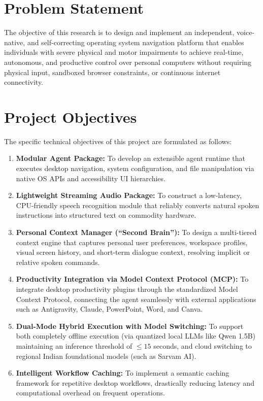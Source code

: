\documentclass[12pt,a4paper]{report}
\begin{document}
\section{Problem Statement}
The objective of this research is to design and implement an independent, voice-native, and self-correcting operating system navigation platform that enables individuals with severe physical and motor impairments to achieve real-time, autonomous, and productive control over personal computers without requiring physical input, sandboxed browser constraints, or continuous internet connectivity.

\section{Project Objectives}
The specific technical objectives of this project are formulated as follows:
\begin{enumerate}[1.]
    \item \textbf{Modular Agent Package:} To develop an extensible agent runtime that executes desktop navigation, system configuration, and file manipulation via native OS APIs and accessibility UI hierarchies.
    \item \textbf{Lightweight Streaming Audio Package:} To construct a low-latency, CPU-friendly speech recognition module that reliably converts natural spoken instructions into structured text on commodity hardware.
    \item \textbf{Personal Context Manager (``Second Brain''):} To design a multi-tiered context engine that captures personal user preferences, workspace profiles, visual screen history, and short-term dialogue context, resolving implicit or relative spoken commands.
    \item \textbf{Productivity Integration via Model Context Protocol (MCP):} To integrate desktop productivity plugins through the standardized Model Context Protocol, connecting the agent seamlessly with external applications such as Antigravity, Claude, PowerPoint, Word, and Canva.
    \item \textbf{Dual-Mode Hybrid Execution with Model Switching:} To support both completely offline execution (via quantized local LLMs like Qwen 1.5B) maintaining an inference threshold of $\le 15$ seconds, and cloud switching to regional Indian foundational models (such as Sarvam AI).
    \item \textbf{Intelligent Workflow Caching:} To implement a semantic caching framework for repetitive desktop workflows, drastically reducing latency and computational overhead on frequent operations.
\end{enumerate}
\end{document}
